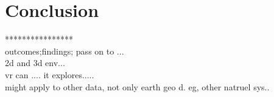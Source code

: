 \label{chapter-conclusion}
\chapter{Conclusion}

****************\\
outcomes;findings; pass  on to ...\\
2d and 3d env...\\
vr can .... it explores.....\\
might apply to other data, not only earth geo d.   eg, other natruel sys..\\

